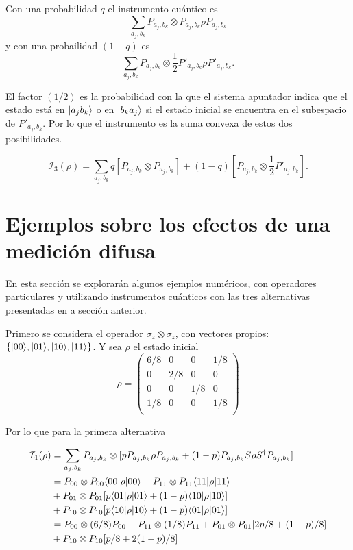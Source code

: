 Con una probabilidad $q$ el instrumento cuántico es \[\sum_{a_j,b_k}P_{a_j,b_k}\otimes P_{a_j,b_k}\rho P_{a_j,b_k}\] y con una probailidad $(1-q)$ es \[\sum_{a_j,b_k} P_{a_j,b_k}\otimes \frac{1}{2} P'_{a_j,b_k}\rho P'_{a_j,b_k}.\]

El factor $(1/2)$ es la probabilidad con la que el sistema apuntador indica  que el estado está en $|a_j b_k\rangle $ o en $|b_k a_j\rangle$ si el estado inicial se encuentra en el subespacio de $P'_{a_j,b_k}$. Por lo que el instrumento es la suma convexa de estos dos posibilidades.

\begin{equation}
    \mathcal{I}_3(\rho)=\sum_{a_j,b_k} q [P_{a_j,b_k}\otimes P_{a_j,b_k}]+ (1-q)[P_{a_j,b_k}\otimes \frac{1}{2} P'_{a_j,b_k}].
\end{equation}  





\section{Ejemplos sobre los efectos de una medición difusa}

En esta sección se explorarán algunos ejemplos numéricos, con operadores particulares y utilizando instrumentos cuánticos con las tres alternativas presentadas en a sección anterior.

Primero se considera el operador $\sigma_z \otimes \sigma_z$, con vectores propios: $\{|00\rangle, |01\rangle, |10\rangle, |11\rangle\}$. Y sea $\rho $ el estado inicial
\[\rho={\begin{pmatrix}6/8&0&0 &1/8\\0&2/8&0 &0\\0 &0 &1/8 &0 \\1/8&0&0&1/8\\\end{pmatrix}}\]


Por lo que  para la primera alternativa 

\begin{equation}\label{primer_alternativa_ejemplo}
    \begin{split}
        \mathcal{I}_1(\rho)&=\sum_{a_j,b_k}P_{a_j,b_k}\otimes[p P_{a_j,b_k}\rho P_{a_j,b_k}+(1-p)P_{a_j,b_k}S\rho S^\dagger P_{a_j,b_k}]\\
        &=P_{00}\otimes P_{00} \langle 00|\rho|00\rangle + P_{11}\otimes P_{11} \langle 11|\rho|11\rangle\\
        &+P_{01} \otimes P_{01}[p \langle 01|\rho|01\rangle+(1-p)\langle 10|\rho|10\rangle]\\
        &+P_{10} \otimes P_{10}[p \langle 10|\rho|10\rangle+(1-p)\langle 01|\rho|01\rangle]\\
        &=P_{00}\otimes (6/8)P_{00} + P_{11}\otimes (1/8)P_{11}+P_{01} \otimes P_{01}[2p/8 +(1-p)/8]\\
        &+P_{10} \otimes P_{10}[p/8+2(1-p)/8]\\
    \end{split}
\end{equation}


